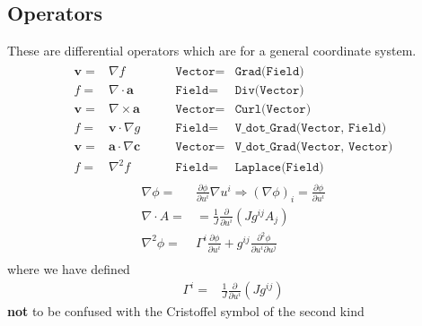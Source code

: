 \documentclass[12pt]{article}
\newcommand{\code}[1]{\texttt{#1}}
\newcommand{\deriv}[2]{\ensuremath{\frac{\partial #1}{\partial #2}}}
\begin{document}
\subsection{Operators}
%
These are differential operators which are for a general coordinate system.
%
\begin{align}
%
\begin{array}{rclrcl}
\mathbf{v} =& \nabla f &\qquad \code{Vector} =& \code{Grad(Field)} \\
f =& \nabla\cdot\mathbf{a} &\qquad \code{Field} =& \code{Div(Vector)} \\
\mathbf{v} =& \nabla\times\mathbf{a} &\qquad \code{Vector} =& \code{Curl(Vector)} \\
f =& \mathbf{v}\cdot\nabla g &\qquad \code{Field} =& \code{V\_dot\_Grad(Vector, Field)} \\
\mathbf{v} =& \mathbf{a}\cdot\nabla\mathbf{c} &\qquad \code{Vector} =&
\code{V\_dot\_Grad(Vector, Vector)} \\
f =& \nabla^2 f &\qquad \code{Field} =& \code{Laplace(Field)}
\end{array}
%
\end{align}
%
\begin{eqnarray*}
\nabla\phi =& \deriv{\phi}{u^i}\nabla u^i \Rightarrow \left(\nabla\phi\right)_i
    = \deriv{\phi}{u^i} \\ \nabla\cdot A =& =
    \frac{1}{J}\deriv{}{u^i}\left(Jg^{ij}A_j\right) \\ \nabla^2\phi =&
    \Gamma^i\deriv{\phi}{u^i} + g^{ij}\frac{\partial^2\phi}{\partial
    u^i\partial u^j} \\
\end{eqnarray*}
%
where we have defined
%
\begin{align*}
\Gamma^i =& \frac{1}{J}\deriv{}{u^i}\left(Jg^{ij}\right)
\end{align*}
%
\textbf{not} to be confused with the Cristoffel symbol of the second kind
\end{document}

